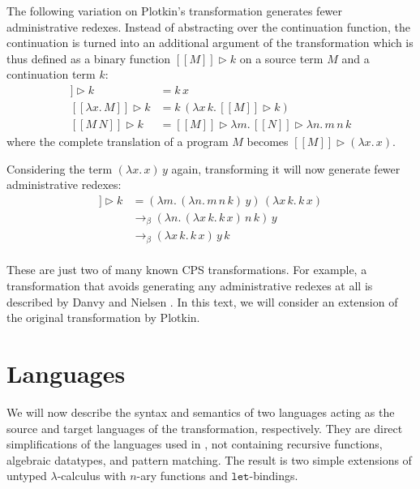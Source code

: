 \documentclass[a4paper,11pt,draft]{article}
\newcommand{\kw}[1]{\mathtt{#1}}
\begin{document}
The following variation on Plotkin's transformation generates fewer
administrative redexes. Instead of abstracting over the continuation function,
the continuation is turned into an additional argument of the transformation which
is thus defined as a binary function $[\![M]\!] \triangleright k$ on a source term
$M$ and a continuation term $k$:
\begin{align*}
  [\![x]\!] \triangleright k               &= k \, x\\
  [\![\lambda x. \, M]\!] \triangleright k &= k \, (\lambda x \, k. \, [\![M]\!] \triangleright k)\\
  [\![M \, N]\!] \triangleright k          &= [\![M]\!] \triangleright \lambda m. \, [\![N]\!] \triangleright \lambda n. \, m \, n \, k
\end{align*}
where the complete translation of a program $M$ becomes
$[\![M]\!] \triangleright (\lambda x. \, x)$.

Considering the term $(\lambda x. \, x) \, y$ again, transforming it will now
generate fewer administrative redexes:
\begin{align*}
  [\![(\lambda x. \, x) \, y]\!] \triangleright k &= (\lambda m. \, (\lambda n. \, m \, n \, k) \, y) \, (\lambda x \, k. \, k \, x)\\
                                                  &\rightarrow_{\beta} (\lambda n. \, (\lambda x \, k. \, k \, x) \, n \, k) \, y\\
                                                  &\rightarrow_{\beta} (\lambda x \, k. \, k \, x) \, y \, k
\end{align*}

\paragraph{}

These are just two of many known CPS transformations. For example, a
transformation that avoids generating any administrative redexes at all is
described by Danvy and Nielsen \cite{Danvy-Nielsen-03}. In this text, we
will consider an extension of the original transformation by Plotkin.


\section{Languages}\label{sec:languages}

We will now describe the syntax and semantics of two languages acting as the
source and target languages of the transformation, respectively.
They are direct simplifications of the languages used in
\cite{Dargaye-Leroy-07}, not containing recursive functions, algebraic
datatypes, and pattern matching.
The result is two simple extensions of untyped $\lambda$-calculus with $n$-ary
functions and $\kw{let}$-bindings.
\end{document}
